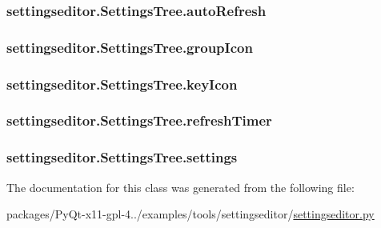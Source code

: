\subsubsection[{auto\+Refresh}]{\setlength{\rightskip}{0pt plus 5cm}settingseditor.\+Settings\+Tree.\+auto\+Refresh}\label{classsettingseditor_1_1SettingsTree_a160b775a4c6a43f70645b55e7ce8be77}
\hypertarget{classsettingseditor_1_1SettingsTree_abbc7c240cabc47abd594fc1ef2b47cef}{}
\subsubsection[{group\+Icon}]{\setlength{\rightskip}{0pt plus 5cm}settingseditor.\+Settings\+Tree.\+group\+Icon}\label{classsettingseditor_1_1SettingsTree_abbc7c240cabc47abd594fc1ef2b47cef}
\hypertarget{classsettingseditor_1_1SettingsTree_a385ced69d31b75cc9a4ae521101f5147}{}
\subsubsection[{key\+Icon}]{\setlength{\rightskip}{0pt plus 5cm}settingseditor.\+Settings\+Tree.\+key\+Icon}\label{classsettingseditor_1_1SettingsTree_a385ced69d31b75cc9a4ae521101f5147}
\hypertarget{classsettingseditor_1_1SettingsTree_a4167ff1302b956be7289dea74410c9d7}{}
\subsubsection[{refresh\+Timer}]{\setlength{\rightskip}{0pt plus 5cm}settingseditor.\+Settings\+Tree.\+refresh\+Timer}\label{classsettingseditor_1_1SettingsTree_a4167ff1302b956be7289dea74410c9d7}
\hypertarget{classsettingseditor_1_1SettingsTree_a43822d0e856b0c76a657b33d3ca517af}{}
\subsubsection[{settings}]{\setlength{\rightskip}{0pt plus 5cm}settingseditor.\+Settings\+Tree.\+settings}\label{classsettingseditor_1_1SettingsTree_a43822d0e856b0c76a657b33d3ca517af}


The documentation for this class was generated from the following file\+:\begin{DoxyCompactItemize}
\item 
packages/\+Py\+Qt-\/x11-\/gpl-\/4../examples/tools/settingseditor/\hyperlink{settingseditor_8py}{settingseditor.\+py}\end{DoxyCompactItemize}
